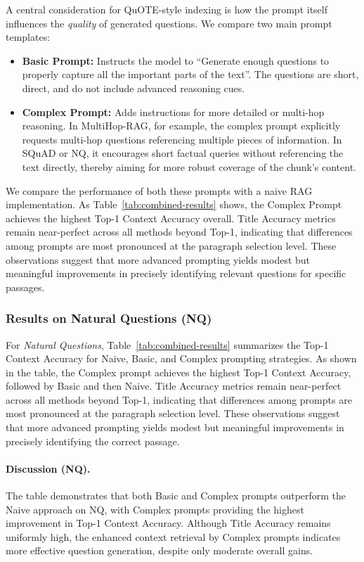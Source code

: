 A central consideration for QuOTE-style indexing is how the prompt itself influences the \emph{quality} of generated questions. We compare two main prompt templates:
\begin{itemize}
    \item \textbf{Basic Prompt:} Instructs the model to “Generate enough questions to properly capture all the important parts of the text”. The questions are short, direct, and do not include advanced reasoning cues.
    \item \textbf{Complex Prompt:} Adds instructions for more detailed or multi-hop reasoning. In MultiHop-RAG, for example, the complex prompt explicitly requests multi-hop questions referencing multiple pieces of information. In SQuAD or NQ, it encourages short factual queries without referencing the text directly, thereby aiming for more robust coverage of the chunk’s content.
\end{itemize}
\noindent
We compare the performance of both these prompts with a naive RAG implementation.
As
Table~\ref{tab:combined-results}
shows,
the Complex Prompt achieves the highest
Top-1 Context Accuracy overall.
Title Accuracy metrics remain near-perfect across all methods beyond Top-1, indicating that differences among prompts are most pronounced at the paragraph selection level. These observations suggest that more advanced prompting yields modest but meaningful improvements in precisely identifying relevant
questions for specific
passages.

\iffalse
\vspace{1em}
\subsubsection{Results on Natural Questions (NQ)}
\label{subsubsec:prompt-nq}
For \emph{Natural Questions}, Table~\ref{tab:combined-results} summarizes the Top-1 Context Accuracy for Naive, Basic, and Complex prompting strategies. As shown in the table, the Complex prompt achieves the highest Top-1 Context Accuracy, followed by Basic and then Naive. Title Accuracy metrics remain near-perfect across all methods beyond Top-1, indicating that differences among prompts are most pronounced at the paragraph selection level. These observations suggest that more advanced prompting yields modest but meaningful improvements in precisely identifying the correct passage.

\paragraph{Discussion (NQ).}
The table demonstrates that both Basic and Complex prompts outperform the Naive approach on NQ, with Complex prompts providing the highest improvement in Top-1 Context Accuracy. Although Title Accuracy remains uniformly high, the enhanced context retrieval by Complex prompts indicates more effective question generation, despite only moderate overall gains.

